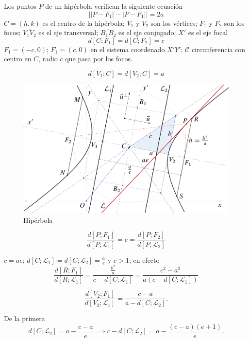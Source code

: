 \documentclass[10pt,]{krantz}
\let\oldincludegraphics\includegraphics
\renewcommand\includegraphics[2][]{%
  \oldincludegraphics[scale=0.85]{#2}
}
\theoremstyle{definition}
\theoremstyle{definition}
\theoremstyle{definition}
\theoremstyle{remark}
\begin{document}
Los puntos \(P\) de un hipérbola verifican la siguiente ecuación
\[\left|\left|P-F_1\right|-\left|P-F_1\right|\right|=2a\]
\(C=(h,k)\) es el centro de la hipérbola; \(V_1\) y \(V_2\) son los vértices; \(F_1\) y \(F_2\)
son los focos; \(\overline{V_1V_2}\) es el eje transversal; \(\overline{B_1B_2}\) es el eje conjugado; \(X'\) es el eje focal
\[d\left[C;F_1\right]=d\left[C;F_2\right]=c\]
\(F_1=(-c,0)\); \(F_1=(c,0)\) en el sistema coordenado \(X'Y'\); \(\mathcal{C}\) circunferencia con centro en \(C\), radio \(c\) que pasa por los focos.

\[d\left[V_1;C\right]=d\left[V_2;C\right]=a\]

\begin{figure}

{\centering \includegraphics{hiperbola} 

}

\caption{Hipérbola}\label{fig:hiperbola}
\end{figure}

\[\frac{d\left[P;F_1\right]}{d\left[P;\mathcal{L}_1\right]}=e=\frac{d\left[P;F_2\right]}{d\left[P;\mathcal{L}_2\right]}\]

\(c=ae\); \(d\left[C;\mathcal{L}_1\right]=d\left[C;\mathcal{L}_2\right]=\frac{a}{e}\) y \(e>1\); en efecto \[\frac{d\left[R;F_1\right]}{d\left[R;\mathcal{L}_1\right]}=\frac{\frac{b^2}{a}}{c-d\left[C;\mathcal{L}_1\right]}=\frac{c^2-a^2}{a(c-d\left[C;\mathcal{L}_1\right])}\]

\[\frac{d\left[V_2;F_1\right]}{d\left[V_2;\mathcal{L}_1\right]}=\frac{c-a}{a-d\left[C;\mathcal{L}_2\right]}.\]

De la primera \[d\left[C;\mathcal{L}_2\right]=a-\frac{c-a}{e}\implies c-d\left[C;\mathcal{L}_2\right]=a-\frac{(c-a)(e+1)}{e}.\]
\end{document}
